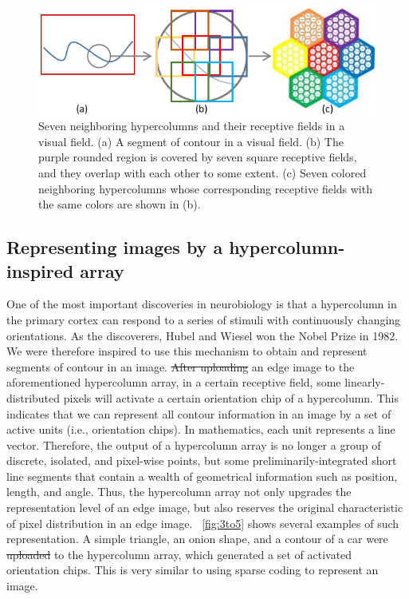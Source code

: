 \documentclass[journal]{IEEEtran}
\providecommand{\DIFadd}[1]{{\protect\color{blue}\uwave{#1}}} %
\providecommand{\DIFdel}[1]{{\protect\color{red}\sout{#1}}}                      %
\providecommand{\DIFaddbegin}{} %
\providecommand{\DIFaddend}{} %
\providecommand{\DIFdelbegin}{} %
\providecommand{\DIFdelend}{} %
\begin{document}
\begin{figure}[!t]
\centering
\includegraphics[width=0.8\linewidth]{images/fig2.pdf}
\caption{Seven neighboring hypercolumns and their receptive fields in a visual field. 
(a) A segment of contour in a visual field. 
(b) The purple rounded region is covered by seven square receptive fields, 
and they overlap with each other to some extent. 
(c) Seven colored neighboring hypercolumns whose corresponding receptive fields with the same colors 
are shown in (b).}
\label{fig:2}
\end{figure}

\subsection{Representing images by a hypercolumn-inspired array}

One of the most important discoveries in neurobiology is that a hypercolumn in the primary cortex can respond to a series of stimuli with continuously changing orientations. 
As the discoverers, Hubel and Wiesel won the Nobel Prize in 1982. 
We were therefore inspired to use this mechanism to obtain and represent segments of contour in an image. 
\DIFdelbegin \DIFdel{After uploading }\DIFdelend \DIFaddbegin \DIFadd{When }\DIFaddend an edge image \DIFaddbegin \DIFadd{is presented }\DIFaddend to the aforementioned hypercolumn array, 
in a certain receptive field, 
some linearly-distributed pixels will activate a certain orientation chip of a hypercolumn. 
This indicates that we can represent all contour information in an image by a set of active units (i.e., orientation chips). In mathematics, each unit represents a line vector. Therefore, the output of a hypercolumn array is no longer a group of discrete, isolated, and pixel-wise points, 
but some preliminarily-integrated short line segments that contain a wealth of geometrical information such as position, length, and angle. 
Thus, the hypercolumn array not only upgrades the representation level of an edge image, 
but also reserves the original characteristic of pixel distribution in an edge image. 
\figurename~\ref{fig:3to5} shows several examples of such representation.
A simple triangle, an onion shape, and a contour of a car were \DIFdelbegin \DIFdel{uploaded }\DIFdelend \DIFaddbegin \DIFadd{presented }\DIFaddend to the hypercolumn array,
which generated a set of activated orientation chips.
This is very similar to using sparse coding to represent an image.
\end{document}
